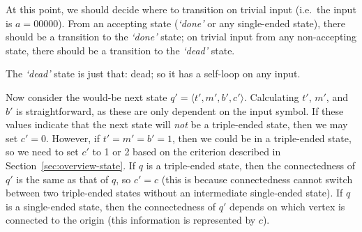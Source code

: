 At this point, we should decide where to transition on trivial input (i.e.\ the input is $a=00000$). From an accepting state (\emph{`done'} or any single-ended state), there should be a transition to the \emph{`done'} state; on trivial input from any non-accepting state, there should be a transition to the \emph{`dead'} state.

The \emph{`dead'} state is just that: dead; so it has a self-loop on any input.

Now consider the would-be next state $q'=\langle t', m', b', c' \rangle$. Calculating $t'$, $m'$, and $b'$ is straightforward, as these are only dependent on the input symbol. If these values indicate that the next state will \emph{not} be a triple-ended state, then we may set $c'=0$. However, if $t'=m'=b'=1$, then we could be in a triple-ended state, so we need to set $c'$ to 1 or 2 based on the criterion described in Section~\ref{sec:overview-state}. If $q$ is a triple-ended state, then the connectedness of $q'$ is the same as that of $q$, so $c'=c$ (this is because connectedness cannot switch between two triple-ended states without an intermediate single-ended state). If $q$ is a single-ended state, then the connectedness of $q'$ depends on which vertex is connected to the origin (this information is represented by $c$).


